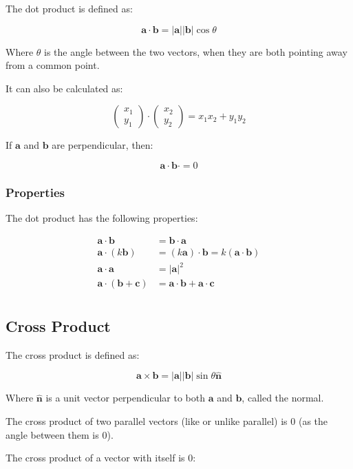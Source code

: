 \documentclass[a4paper,11pt]{report}
\newcommand{\bb}{\boldsymbol}
\begin{document}
The dot product is defined as:

$$
\bb{a} \cdot \bb{b} = \lvert \bb{a} \rvert \lvert \bb{b} \rvert \cos{\theta}
$$

Where $\theta$ is the angle between the two vectors, when they are both pointing
away from a common point.

It can also be calculated as:

$$
\begin{pmatrix} x_1 \\ y_1 \end{pmatrix} \cdot \begin{pmatrix} x_2 \\ y_2 \end{pmatrix} = x_1 x_2 + y_1 y_2
$$

If $\bb{a}$ and $\bb{b}$ are perpendicular, then:

$$
\bb{a} \cdot \bb{b}\cdot = 0
$$

\subsubsection{Properties}

The dot product has the following properties:

$$
\begin{aligned}
\bb{a} \cdot \bb{b} & = \bb{b} \cdot \bb{a} \\
\bb{a} \cdot (k \bb{b}) & = (k \bb{a}) \cdot \bb{b} = k (\bb{a} \cdot \bb{b}) \\
\bb{a} \cdot \bb{a} & = \lvert \bb{a} \rvert^2 \\
\bb{a} \cdot (\bb{b} + \bb{c}) & = \bb{a} \cdot \bb{b} + \bb{a} \cdot \bb{c} \\
\end{aligned}
$$

\subsection{Cross Product}

The cross product is defined as:

$$
\bb{a} \times \bb{b} = \lvert \bb{a} \rvert \lvert \bb{b} \rvert \sin{\theta} \hat{\bb{n}}
$$

Where $\hat{\bb{n}}$ is a unit vector perpendicular to both $\bb{a}$ and
$\bb{b}$, called the normal.

The cross product of two parallel vectors (like or unlike parallel) is 0 (as
the angle between them is 0).

The cross product of a vector with itself is 0:
\end{document}
